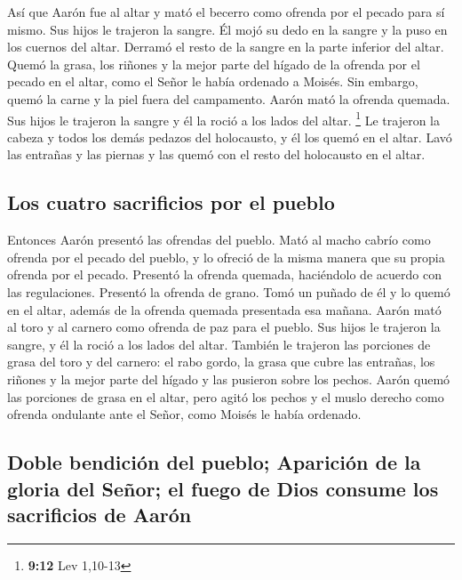  Así que Aarón fue al altar y mató el becerro como ofrenda
por el pecado para sí mismo.  Sus hijos le trajeron la
sangre. Él mojó su dedo en la sangre y la puso en los cuernos del altar.
Derramó el resto de la sangre en la parte inferior del altar.
 Quemó la grasa, los riñones y la mejor parte del hígado
de la ofrenda por el pecado en el altar, como el Señor le había ordenado
a Moisés.  Sin embargo, quemó la carne y la piel fuera
del campamento.  Aarón mató la ofrenda quemada. Sus hijos
le trajeron la sangre y él la roció a los lados del altar. \footnote{\textbf{9:12}
  Lev 1,10-13}  Le trajeron la cabeza y todos los demás
pedazos del holocausto, y él los quemó en el altar.  Lavó
las entrañas y las piernas y las quemó con el resto del holocausto en el
altar.

\hypertarget{los-cuatro-sacrificios-por-el-pueblo}{%
\subsection{Los cuatro sacrificios por el
pueblo}\label{los-cuatro-sacrificios-por-el-pueblo}}

 Entonces Aarón presentó las ofrendas del pueblo. Mató al
macho cabrío como ofrenda por el pecado del pueblo, y lo ofreció de la
misma manera que su propia ofrenda por el pecado. 
Presentó la ofrenda quemada, haciéndolo de acuerdo con las regulaciones.
 Presentó la ofrenda de grano. Tomó un puñado de él y lo
quemó en el altar, además de la ofrenda quemada presentada esa mañana.
 Aarón mató al toro y al carnero como ofrenda de paz para
el pueblo. Sus hijos le trajeron la sangre, y él la roció a los lados
del altar.  También le trajeron las porciones de grasa
del toro y del carnero: el rabo gordo, la grasa que cubre las entrañas,
los riñones y la mejor parte del hígado  y las pusieron
sobre los pechos. Aarón quemó las porciones de grasa en el altar,
 pero agitó los pechos y el muslo derecho como ofrenda
ondulante ante el Señor, como Moisés le había ordenado.

\hypertarget{doble-bendiciuxf3n-del-pueblo-apariciuxf3n-de-la-gloria-del-seuxf1or-el-fuego-de-dios-consume-los-sacrificios-de-aaruxf3n}{%
\subsection{Doble bendición del pueblo; Aparición de la gloria del
Señor; el fuego de Dios consume los sacrificios de
Aarón}\label{doble-bendiciuxf3n-del-pueblo-apariciuxf3n-de-la-gloria-del-seuxf1or-el-fuego-de-dios-consume-los-sacrificios-de-aaruxf3n}}


